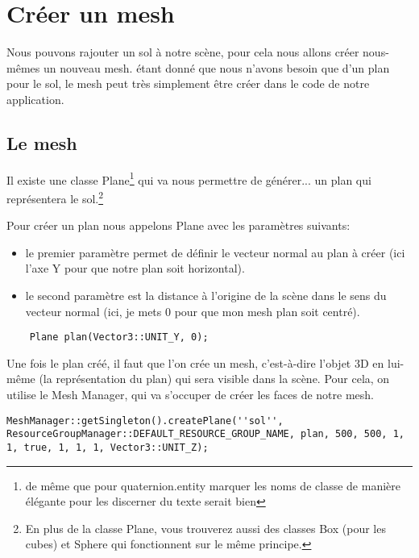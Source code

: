 \section{Créer un mesh}

Nous pouvons rajouter un sol à notre scène, pour cela nous allons créer nous-mêmes un nouveau mesh. étant donné que nous n'avons besoin que d'un plan pour le sol, le mesh peut très simplement être créer dans le code de notre application.



\subsection{Le mesh}

Il existe une classe Plane\footnote{de même que pour quaternion.entity marquer les noms de classe de manière élégante pour les discerner du texte serait bien} qui va nous permettre de générer... un plan qui représentera le sol.\footnote{En plus de la classe Plane, vous trouverez aussi des classes Box (pour les cubes) et Sphere qui fonctionnent sur le même principe.}\newline

Pour créer un plan nous appelons Plane avec les paramètres suivants:
\begin{itemize}
\item le premier paramètre permet de définir le vecteur normal au plan à créer (ici l'axe Y pour que notre plan soit horizontal).
\item le second paramètre est la distance à l'origine de la scène dans le sens du vecteur normal  (ici, je mets 0 pour que mon mesh plan soit centré). 
\end{itemize}

\begin{lstlisting}
	Plane plan(Vector3::UNIT_Y, 0);
\end{lstlisting}

Une fois le plan créé, il faut que l'on crée un mesh, c'est-à-dire l'objet 3D en lui-même (la représentation du plan) qui sera visible dans la scène.
Pour cela, on utilise le Mesh Manager, qui va s'occuper de créer les faces de notre mesh.

\begin{lstlisting}
MeshManager::getSingleton().createPlane(''sol'', ResourceGroupManager::DEFAULT_RESOURCE_GROUP_NAME, plan, 500, 500, 1, 1, true, 1, 1, 1, Vector3::UNIT_Z);
\end{lstlisting}

